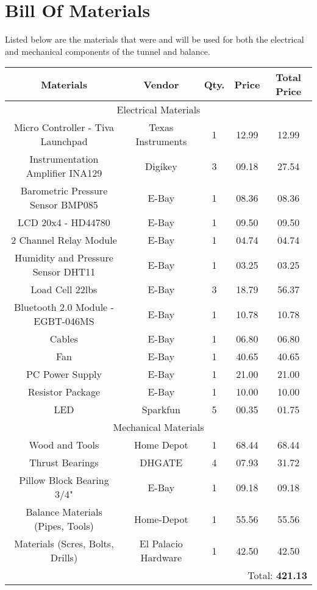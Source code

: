 \section{Bill Of Materials}
	Listed below are the materials that were and will be used for both the electrical and mechanical
	components of the tunnel and balance. \\

	\noindent
	\begin{tabular}{|c|c|c|c|c|}
		\hline
			\textbf{Materials} & \textbf{Vendor} & \textbf{Qty.} & \textbf{Price} & \textbf{Total Price}  \\
		\hline
			\multicolumn{5}{|c|}{Electrical Materials} \\
		\hline
			Micro Controller - Tiva Launchpad 	& Texas Instruments 	& 1 & 12.99 & 12.99 \\
			Instrumentation Amplifier INA129 	& Digikey 				& 3 & 09.18 & 27.54 \\
			Barometric Pressure Sensor BMP085 	& E-Bay 				& 1 & 08.36 & 08.36 \\
			LCD 20x4 - HD44780				 	& E-Bay 				& 1 & 09.50 & 09.50 \\
			2 Channel Relay Module			 	& E-Bay 				& 1 & 04.74 & 04.74 \\
			Humidity and Pressure Sensor DHT11	& E-Bay 				& 1 & 03.25 & 03.25 \\
			Load Cell 22lbs						& E-Bay					& 3 & 18.79 & 56.37 \\
			Bluetooth 2.0 Module - EGBT-046MS	& E-Bay					& 1 & 10.78 & 10.78 \\
			Cables								& E-Bay					& 1 & 06.80 & 06.80 \\
			Fan									& E-Bay					& 1 & 40.65 & 40.65 \\
			PC Power Supply						& E-Bay					& 1 & 21.00 & 21.00 \\
			Resistor Package					& E-Bay					& 1 & 10.00	& 10.00 \\
			LED									& Sparkfun				& 5 & 00.35 & 01.75 \\

		\hline
			\multicolumn{5}{|c|}{Mechanical Materials} \\
		\hline
			Wood and Tools						& Home Depot			& 1 & 68.44 & 68.44 \\
			Thrust Bearings						& DHGATE				& 4 & 07.93 & 31.72 \\
			Pillow Block Bearing 3/4"			& E-Bay					& 1 & 09.18 & 09.18 \\
			Balance Materials (Pipes, Tools)	& Home-Depot			& 1 & 55.56 & 55.56 \\
			Materials (Scres, Bolts, Drills)	& El Palacio Hardware	& 1 & 42.50 & 42.50 \\
		\hline
			\multicolumn{5}{|r|}{Total: \textbf{421.13}} \\
		\hline
	\end{tabular} \\

\newpage